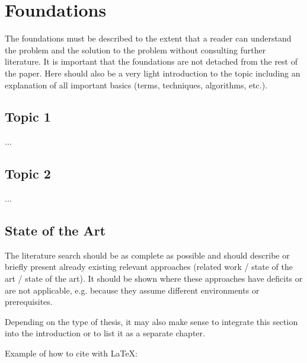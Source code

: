 
\chapter{Foundations}
\label{ch:foundations}
The foundations must be described to the extent that a reader can understand the problem and the solution to the problem without consulting further literature. It is important that the foundations are not detached from the rest of the paper. Here should also be a very light introduction to the topic including an explanation of all important basics (terms, techniques, algorithms, etc.).


\section{Topic 1}
\label{ch:foundations:sec:section1}

...

\section{Topic 2}
\label{ch:foundations:sec:section2}

...

\section{State of the Art}
\label{ch:foundations:sec:SOTA}
The literature search should be as complete as possible and should describe or briefly present already existing relevant approaches (related work / state of the art / state of the art). It should be shown where these approaches have deficits or are not applicable, e.g. because they assume different environments or prerequisites.

Depending on the type of thesis, it may also make sense to integrate this section into the introduction or to list it as a separate chapter.

Example of how to cite with LaTeX: \cite{TB98,JSAC96,qosr}

